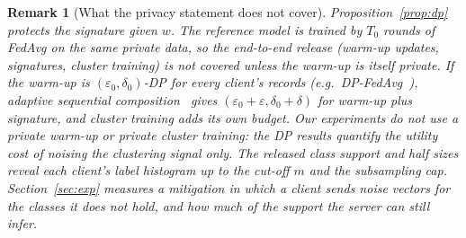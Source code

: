 \documentclass[pdflatex,sn-apa]{sn-jnl}
\theoremstyle{thmstyleone}
\theoremstyle{thmstylethree}
\newtheorem{remark}{Remark}
\begin{document}
\begin{remark}[What the privacy statement does not cover]\label{rem:dp}
Proposition~\ref{prop:dp} protects the signature \emph{given} $w$. The reference model is trained by $T_0$ rounds of FedAvg on the same private data, so the end-to-end release (warm-up updates, signatures, cluster training) is not covered unless the warm-up is itself private. If the warm-up is $(\varepsilon_0,\delta_0)$-DP for every client's records (e.g.\ DP-FedAvg~\citep{mcmahan2018dpfedavg}), adaptive sequential composition~\citep{dwork2014dp} gives $(\varepsilon_0+\varepsilon,\delta_0+\delta)$ for warm-up plus signature, and cluster training adds its own budget. Our experiments do not use a private warm-up or private cluster training: the DP results quantify the utility cost of noising the clustering signal only. The released class support and half sizes reveal each client's label histogram up to the cut-off $m$ and the subsampling cap. Section~\ref{sec:exp} measures a mitigation in which a client sends noise vectors for the classes it does not hold, and how much of the support the server can still infer.
\end{remark}
\end{document}
